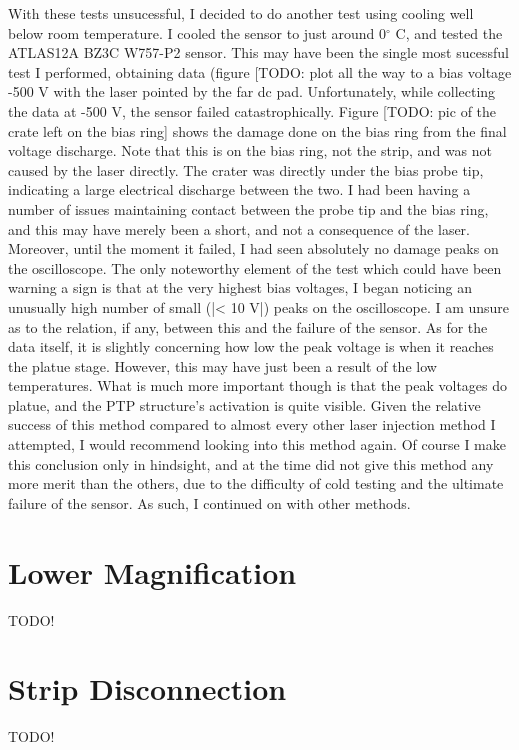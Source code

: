\documentclass{report}
\begin{document}
            With these tests unsucessful, I decided to do another test using cooling well below room temperature. I cooled the sensor to just around 0$^\circ$ C, and tested the ATLAS12A BZ3C W757-P2 sensor. This may have been the single most sucessful test I performed, obtaining data (figure [TODO: plot
            all the way to a bias voltage -500 V with the laser pointed by the far dc pad. Unfortunately, while collecting the data at -500 V, the sensor failed catastrophically. Figure [TODO: pic of the crate left on the bias ring] shows the damage done on the bias ring from the final voltage discharge. Note that this is on the bias ring, not the strip, and was not caused by the laser directly. The crater was directly under the bias probe tip, indicating a large electrical discharge between the two. I had been having a number of issues maintaining contact between the probe tip and the bias ring, and this may have merely been a short, and not a consequence of the laser. Moreover, until the moment it failed, I had seen absolutely no damage peaks on the oscilloscope. The only noteworthy element of the test which could have been warning a sign is that at the very highest bias voltages, I began noticing an unusually high number of small (|< 10 V|) peaks on the oscilloscope. I am unsure as to the relation, if any, between this and the failure of the sensor. As for the data itself, it is slightly concerning how low the peak voltage is when it reaches the platue stage. However, this may have just been a result of the low temperatures. What is much more important though is that the peak voltages do platue, and the PTP structure's activation is quite visible. Given the relative success of this method compared to almost every other laser injection method I attempted, I would recommend looking into this method again. Of course I make this conclusion only in hindsight, and at the time did not give this method any more merit than the others, due to the difficulty of cold testing and the ultimate failure of the sensor. As such, I continued on with other methods.
            
            
            
        \section{Lower Magnification}
            TODO!

        \section{Strip Disconnection}
            TODO!
\end{document}
